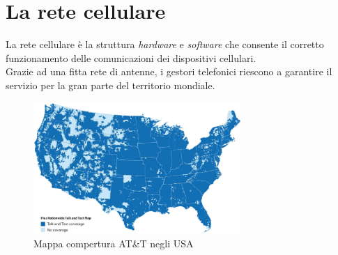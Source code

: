 \chapter{La rete cellulare}
La rete cellulare è la struttura \textit{hardware} e \textit{software} che consente il corretto
funzionamento delle comunicazioni dei dispositivi cellulari.\\
Grazie ad una fitta rete di antenne, i gestori telefonici riescono a garantire il servizio per la  gran parte del territorio mondiale.
\begin{figure}[h]
    \centering
    \includegraphics[width=0.7\textwidth]{images/att-coverage.png}
    \caption{Mappa compertura AT\&T negli USA}
\end{figure}\\

\clearpage

